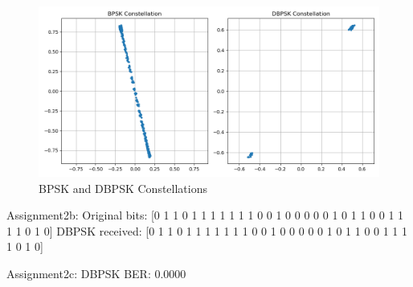 \documentclass[
	letterpaper, %
	10pt, %
]{CSUniSchoolLabReport}
\begin{document}
\begin{figure}[H] %
	\centering %
	\includegraphics[width=1.2\textwidth]{assignment2a.png} %
	\caption{BPSK and DBPSK Constellations}
	\label{fig:block}
\end{figure}

Assignment2b: \newline
Original bits:   [0 1 1 0 1 1 1 1 1 1 1 0 0 1 0 0 0 0 0 1 0 1 1 0 0 1 1 1 1 0 1 0]\newline
DBPSK received:  [0 1 1 0 1 1 1 1 1 1 1 0 0 1 0 0 0 0 0 1 0 1 1 0 0 1 1 1 1 0 1 0]\newline

Assignment2c: \newline
DBPSK BER: 0.0000
\end{document}
